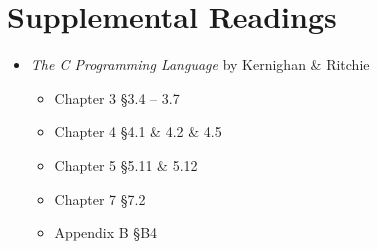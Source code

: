\section{Supplemental Readings}

\begin{itemize}
  \item \emph{The C Programming Language} by Kernighan \& Ritchie
    \begin{itemize}
      \item Chapter 3 \S 3.4 -- 3.7
      \item Chapter 4 \S 4.1 \& 4.2 \& 4.5
      \item Chapter 5 \S 5.11 \& 5.12
      \item Chapter 7 \S 7.2
      \item Appendix B \S B4
    \end{itemize}
\end{itemize}

